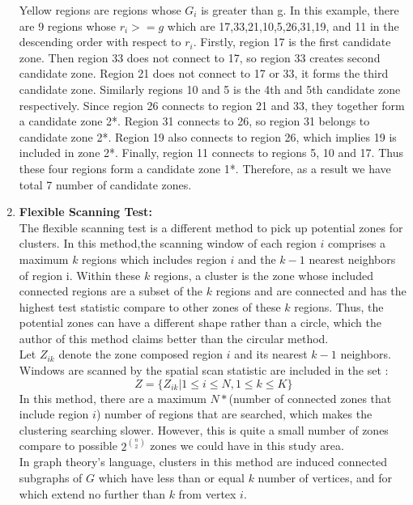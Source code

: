\documentclass[12pt]{article}
\begin{document}
\begin{enumerate}
\begin{figure}[!ht]
	\end{figure}
	
	
	
	Yellow regions are regions whose $G_i$ is greater than g. In this example, there are 9 regions whose $r_i >= g$ which are 17,33,21,10,5,26,31,19, and 11 in the descending order with respect to $r_i$. Firstly, region 17 is the first candidate zone. Then region 33 does not connect to 17, so region 33 creates second candidate zone. Region 21 does not connect to 17 or 33, it forms the third candidate zone. Similarly regions 10 and 5 is the 4th and 5th candidate zone respectively. Since region 26 connects to region 21 and 33, they together form a candidate zone 2*. Region 31 connects to 26, so region 31 belongs to candidate zone 2*. Region 19 also connects to region 26, which implies 19 is included in zone 2*. Finally, region 11 connects to regions 5, 10 and 17. Thus these four regions form a candidate zone 1*. Therefore, as a result we have total 7 number of candidate zones.   
		\item \textbf{ Flexible Scanning Test:}	\\
			
			The flexible scanning test is a different method to pick up potential zones for clusters. In this method,the scanning window of each region $i$ comprises a maximum $k$ regions which includes region $i$ and the $k-1$ nearest neighbors of region i. Within these $k$ regions, a cluster is the zone whose included connected regions are a subset of the $k$ regions and are connected and has the highest test statistic compare to other zones of these $k$ regions. Thus, the potential zones can have a different shape rather than a circle, which the author of this method claims better than the circular method. \\
			
				Let $Z_{ik}$ denote the zone composed region $i$ and its nearest ${k-1}$ neighbors. Windows are scanned by the spatial scan statistic are included in the set : \\
		\[
			Z = \{Z_{ik} | 1 \leq i \leq N, 1 \leq k \leq K \}
		\] 
				In this method, there are a maximum $N*$(number of connected zones that include region $i$) number of regions that are searched, which makes the clustering searching slower. However, this is quite a small number of zones compare to possible $2^{\binom{n}{2}}$ zones we could have in this study area. \\
			
			In graph theory's language, clusters in this method are induced connected subgraphs of $G$ which have less than or equal $k$ number of vertices, and for which extend no further than $k$ from vertex $i$.\\
			 	

\end{enumerate}
\end{document}
